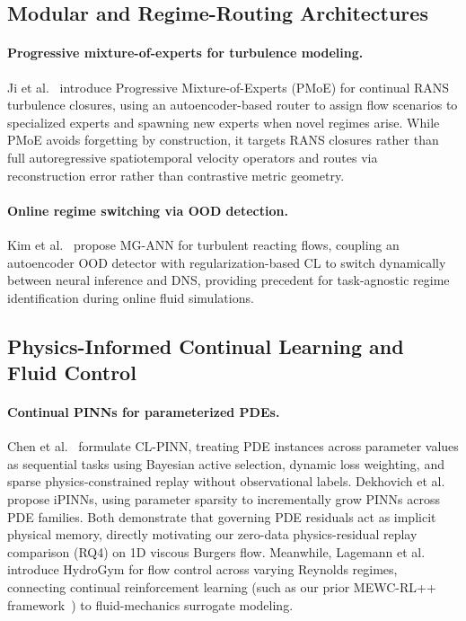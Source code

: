 \documentclass[11pt,a4paper]{article}
\begin{document}
\subsection{Modular and Regime-Routing Architectures}

\paragraph{Progressive mixture-of-experts for turbulence modeling.} Ji et al.~\cite{ji2026pmoe} introduce Progressive Mixture-of-Experts (PMoE) for continual RANS turbulence closures, using an autoencoder-based router to assign flow scenarios to specialized experts and spawning new experts when novel regimes arise. While PMoE avoids forgetting by construction, it targets RANS closures rather than full autoregressive spatiotemporal velocity operators and routes via reconstruction error rather than contrastive metric geometry.

\paragraph{Online regime switching via OOD detection.} Kim et al.~\cite{kim2026mgann} propose MG-ANN for turbulent reacting flows, coupling an autoencoder OOD detector with regularization-based CL to switch dynamically between neural inference and DNS, providing precedent for task-agnostic regime identification during online fluid simulations.

\subsection{Physics-Informed Continual Learning and Fluid Control}

\paragraph{Continual PINNs for parameterized PDEs.} Chen et al.~\cite{chen2026clpinn} formulate CL-PINN, treating PDE instances across parameter values as sequential tasks using Bayesian active selection, dynamic loss weighting, and sparse physics-constrained replay without observational labels. Dekhovich et al.~\cite{dekhovich2025ipinns} propose iPINNs, using parameter sparsity to incrementally grow PINNs across PDE families. Both demonstrate that governing PDE residuals act as implicit physical memory, directly motivating our zero-data physics-residual replay comparison (RQ4) on 1D viscous Burgers flow. Meanwhile, Lagemann et al.~\cite{lagemann2026hydrogym} introduce HydroGym for flow control across varying Reynolds regimes, connecting continual reinforcement learning (such as our prior MEWC-RL++ framework~\cite{hasan2026mewcrlpp}) to fluid-mechanics surrogate modeling.
\end{document}
